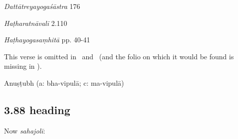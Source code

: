 \begin{ekdosis}
\begin{sources}[hp03_087_1]
\emph{Dattātreyayogaśāstra} 176
\begin{versinnote}
\end{versinnote}
\end{sources}

\begin{testimonia}[hp03_087_1]
\emph{Haṭharatnāvalī} 2.110
\begin{versinnote}
\end{versinnote}

\emph{Haṭhayogasaṃhitā} pp. 40-41
\begin{versinnote}
\end{versinnote}

\end{testimonia}

\begin{philcomm}[hp03_087_1]
This verse is omitted in \alphaTwo\ and \alphaThree\ (and the folio on which it would be found is missing in \alphaOne).
\end{philcomm}

\begin{metre}[hp03_087_1]
Anuṣṭubh (a: bha-vipulā; c: ma-vipulā)
\end{metre}

\subsection*{3.88 heading}
\begin{translation}[hp03_088a]
Now \emph{sahajolī}:
\end{translation}


\end{ekdosis}
